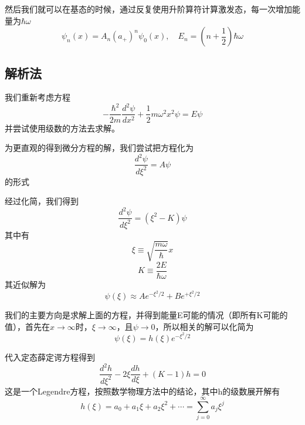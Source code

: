 		然后我们就可以在基态的时候，通过反复使用升阶算符计算激发态，每一次增加能量为$\hbar \omega$
		\begin{equation}
			\boxed{\psi_{n}(x)=A_{n}\left(a_{+}\right)^{n} \psi_{0}(x), \quad E_{n}=\left(n+\frac{1}{2}\right) \hbar \omega}
		\end{equation}
	\subsection{解析法}
		我们重新考虑方程
			\begin{equation}
				-\frac{\hbar^{2}}{2 m} \frac{d^{2} \psi}{d x^{2}}+\frac{1}{2} m \omega^{2} x^{2} \psi=E \psi
			\end{equation}
		并尝试使用级数的方法去求解。

		为更直观的得到微分方程的解，我们尝试把方程化为
		\begin{equation}
			\frac{d^{2} \psi}{d \xi^{2}}=A \psi
		\end{equation}	
		的形式

		经过化简，我们得到
		\begin{equation}
			\frac{d^{2} \psi}{d \xi^{2}}=\left(\xi^{2}-K\right) \psi
		\end{equation}
		其中有
		\begin{equation}
			\xi \equiv \sqrt{\frac{m \omega}{\hbar}} x
		\end{equation}
		\begin{equation}
			K \equiv \frac{2 E}{\hbar \omega}
		\end{equation}
		其近似解为
		\begin{equation}
			\psi(\xi) \approx A e^{-\xi^{2} / 2}+B e^{+\xi^{2} / 2}
		\end{equation}


		我们的主要方向是求解上面的方程，并得到能量E可能的情况（即所有K可能的值），首先在$x \to \infty$时，$\xi \to \infty$，且$\psi \to 0$，所以相关的解可以化简为
		\begin{equation}
			\psi(\xi)=h(\xi) e^{-\xi^{2} / 2}
		\end{equation}

		代入定态薛定谔方程得到
		\begin{equation}
			\frac{d^{2} h}{d \xi^{2}}-2 \xi \frac{d h}{d \xi}+(K-1) h=0
		\end{equation}
		这是一个Legendre方程，按照数学物理方法中的结论，其中h的级数展开解有
		\begin{equation}
			h(\xi)=a_{0}+a_{1} \xi+a_{2} \xi^{2}+\cdots=\sum_{j=0}^{\infty} a_{j} \xi^{j}
		\end{equation}


